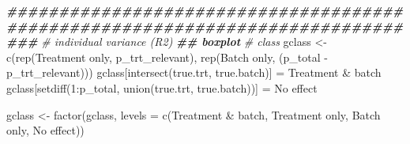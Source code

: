 \documentclass[
]{book}
\newenvironment{Shaded}{\begin{snugshade}}{\end{snugshade}}
\newcommand{\AttributeTok}[1]{\textcolor[rgb]{0.77,0.63,0.00}{#1}}
\newcommand{\CommentTok}[1]{\textcolor[rgb]{0.56,0.35,0.01}{\textit{#1}}}
\newcommand{\DecValTok}[1]{\textcolor[rgb]{0.00,0.00,0.81}{#1}}
\newcommand{\DocumentationTok}[1]{\textcolor[rgb]{0.56,0.35,0.01}{\textbf{\textit{#1}}}}
\newcommand{\FunctionTok}[1]{\textcolor[rgb]{0.00,0.00,0.00}{#1}}
\newcommand{\NormalTok}[1]{#1}
\newcommand{\OtherTok}[1]{\textcolor[rgb]{0.56,0.35,0.01}{#1}}
\newcommand{\SpecialCharTok}[1]{\textcolor[rgb]{0.00,0.00,0.00}{#1}}
\newcommand{\StringTok}[1]{\textcolor[rgb]{0.31,0.60,0.02}{#1}}
\begin{document}
\begin{Shaded}
\begin{Highlighting}[]
\DocumentationTok{\#\#\#\#\#\#\#\#\#\#\#\#\#\#\#\#\#\#\#\#\#\#\#\#\#\#\#\#\#\#\#\#\#\#\#\#\#\#\#\#\#\#\#\#\#\#\#\#\#\#\#\#\#\#\#\#\#\#\#\#\#\#\#\#\#\#\#\#\#\#\#\#\#\#\#\#\#\#\#}
\CommentTok{\# individual variance (R2)}
\DocumentationTok{\#\# boxplot}
\CommentTok{\# class}
\NormalTok{gclass }\OtherTok{\textless{}{-}} \FunctionTok{c}\NormalTok{(}\FunctionTok{rep}\NormalTok{(}\StringTok{\textquotesingle{}Treatment only\textquotesingle{}}\NormalTok{, p\_trt\_relevant), }
            \FunctionTok{rep}\NormalTok{(}\StringTok{\textquotesingle{}Batch only\textquotesingle{}}\NormalTok{, (p\_total }\SpecialCharTok{{-}}\NormalTok{ p\_trt\_relevant)))}
\NormalTok{gclass[}\FunctionTok{intersect}\NormalTok{(true.trt, true.batch)] }\OtherTok{=} \StringTok{\textquotesingle{}Treatment \& batch\textquotesingle{}}
\NormalTok{gclass[}\FunctionTok{setdiff}\NormalTok{(}\DecValTok{1}\SpecialCharTok{:}\NormalTok{p\_total, }\FunctionTok{union}\NormalTok{(true.trt, true.batch))] }\OtherTok{=} \StringTok{\textquotesingle{}No effect\textquotesingle{}}

\NormalTok{gclass }\OtherTok{\textless{}{-}} \FunctionTok{factor}\NormalTok{(gclass, }\AttributeTok{levels =} \FunctionTok{c}\NormalTok{(}\StringTok{\textquotesingle{}Treatment \& batch\textquotesingle{}}\NormalTok{, }
                                    \StringTok{\textquotesingle{}Treatment only\textquotesingle{}}\NormalTok{, }
                                    \StringTok{\textquotesingle{}Batch only\textquotesingle{}}\NormalTok{, }
                                    \StringTok{\textquotesingle{}No effect\textquotesingle{}}\NormalTok{))}


\end{Highlighting}
\end{Shaded}
\end{document}
